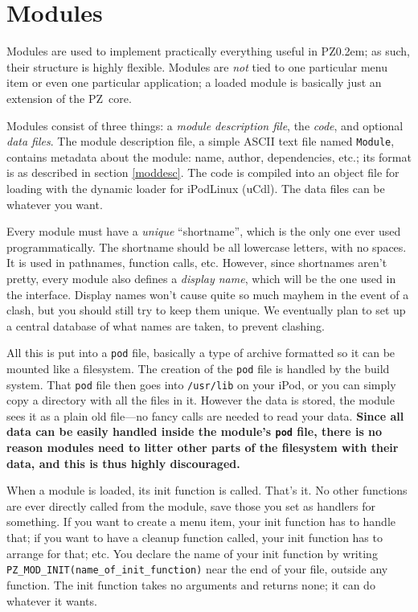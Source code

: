 \documentclass[12pt,letterpaper]{report}
\def\pz{{\footnotesize PZ}}
\def\pzt{\pz\kern0.2em{\large\oldstyle2}}
\begin{document}
\section{Modules}
Modules are used to implement practically everything useful in \pzt; as such, their structure
is highly flexible. Modules are {\it not} tied to one particular menu item or even one particular
application; a loaded module is basically just an extension of the \pz\ core.

Modules consist of three things: a {\sl module description file}, the {\sl code}, and optional {\sl data
files}. The module description file, a simple ASCII text file named \verb|Module|, contains
metadata about the module: name, author, dependencies, etc.; its format is as described in
section \ref{moddesc}. The code is compiled into an object file for loading with the dynamic
loader for iPodLinux (uCdl).
The data files can be whatever you want.

Every module must have a {\it unique} ``shortname'', which is the only one ever used programmatically.
The shortname should be all lowercase letters, with no spaces. It is used in pathnames,
function calls, etc. However, since shortnames aren't pretty, every module also defines a
{\sl display name}, which will be the one used in the interface. Display names won't cause quite
so much mayhem in the event of a clash, but you should still try to keep them unique. We eventually
plan to set up a central database of what names are taken, to prevent clashing.

All this is put into a \verb|pod| file, basically a type of archive formatted so it can be
mounted like a filesystem. The creation of the \verb|pod| file is handled by the build system.
That \verb|pod| file then goes into \verb|/usr/lib| on your iPod, or you can simply copy a directory
with all the files in it.
However the data is stored, the module sees it as a plain old file---no fancy calls are needed
to read your data. {\bf Since all data can be easily handled inside the module's \verb|pod| file, there
is no reason modules need to litter other parts of the filesystem with their data, and this
is thus highly discouraged.}

When a module is loaded, its init function is called. That's it. No other functions are ever
directly called from the module, save those you set as handlers for something. If you want
to create a menu item, your init function has to handle that; if you want to have a cleanup
function called, your init function has to arrange for that; etc. You declare the name of
your init function by writing \verb|PZ_MOD_INIT(name_of_init_function)| near the end of your
file, outside any function. The init function takes no arguments and returns none; it can do
whatever it wants.
\end{document}
